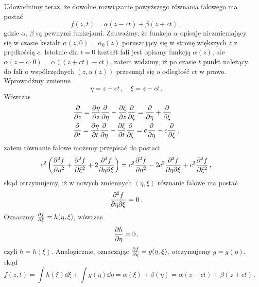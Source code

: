 \documentclass[../main.tex]{subfiles}
\begin{document}
       Udowodnimy teraz, że dowolne rozwiązanie powyższego równania falowego ma postać
       \begin{equation*}
           f(z,t)=\alpha(z-ct)+\beta(z+ct)\,,
       \end{equation*}
      gdzie \(\alpha\), \(\beta\) są pewnymi funkcjami. Zauważmy, że funkcja \(\alpha\) opisuje
      niezmieniający się w czasie kształt \(\alpha(z,0)=\alpha_0(z)\) poruszający się w stronę
      większych \(z\) z prędkością \(c\). Istotnie dla \(t=0\) kształt fali jest opisany funkcją
      \(\alpha(z)\), ale \(\alpha(z-c\cdot 0)=\alpha((z+ct)-ct)\), zatem widzimy, iż po czasie \(t\)
      punkt należący do fali o współrzędnych \((z,\alpha(z))\) przesunął się o odległość \(ct\) w
      prawo. Wprowadźmy zmienne
      \begin{equation*}
          \eta=z+ct\,,\quad \xi=z-ct\,.
      \end{equation*}
      Wówczas
      \begin{equation*}
      \begin{split}
          &\pdv{}{z}=\pdv{\eta}{z}\pdv{}{\eta}+\pdv{\xi}{z}\pdv{}{\xi}=\pdv{}{\eta}+\pdv{}{\xi}\\
          &\pdv{}{t}=\pdv{\eta}{t}\pdv{}{\eta}+\pdv{\xi}{t}\pdv{}{\xi}=c\pdv{}{\eta}-c\pdv{}{\xi}\,,
      \end{split}
      \end{equation*}
        zatem równanie falowe możemy przepisać do postaci
        \begin{equation*}
            c^2\left(\pdv[2]{f}{\eta}+\pdv[2]{f}{\xi}+2\pdv[2]{f}{\eta}{\xi}\right)=c^2\pdv[2]{f}{\eta}-2c^2\pdv[2]{f}{\eta}{\xi}+c^2\pdv[2]{f}{\xi}\,,
        \end{equation*}
        skąd otrzymujemy, iż w nowych zmiennych \((\eta,\xi)\) równanie falowe ma postać
        \begin{equation*}
            \pdv[2]{f}{\eta}{\xi}=0\,.
        \end{equation*}
        Oznaczmy \(\pdv{f}{\xi}=h(\eta,\xi)\), wówczas
        \begin{equation*}
            \pdv{h}{\eta}=0\,,
        \end{equation*}
        czyli \(h=h(\xi)\). Analogicznie, oznaczając \(\pdv{f}{\eta}=g(\eta,\xi)\), otrzymujemy
        \(g=g(\eta)\), skąd
        \begin{equation*}
            f(z,t)=\int h(\xi)\dd{\xi}+\int g(\eta)\dd{\eta}=\alpha(\xi)+\beta(\eta)=\alpha(z-ct)+\beta(z+ct)\,.
        \end{equation*}
\end{document}
